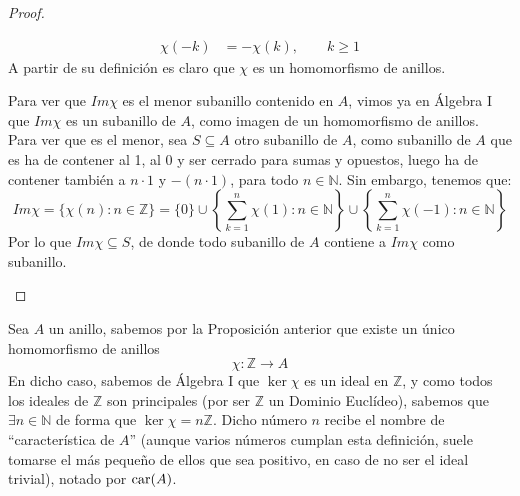 \begin{prop}
\begin{proof}
\begin{description}
\begin{align*}
                    \chi(-k) &= -\chi(k), \qquad k\geq 1
                \end{align*}
                A partir de su definición es claro que $\chi$ es un homomorfismo de anillos.
            \item [Minimalidad.] Para ver que $Im\chi$ es el menor subanillo contenido en $A$, vimos ya en Álgebra I que $Im\chi$ es un subanillo de $A$, como imagen de un homomorfismo de anillos. Para ver que es el menor, sea $S\subseteq A$ otro subanillo de $A$, como subanillo de $A$ que es ha de contener al 1, al 0 y ser cerrado para sumas y opuestos, luego ha de contener también a $n\cdot 1$ y $-(n\cdot 1)$, para todo $n\in \mathbb{N}$. Sin embargo, tenemos que:
                \begin{equation*}
                    Im\chi = \{\chi(n) : n\in \mathbb{Z}\} = \{0\}\cup \left\{\sum_{k=1}^{n}\chi(1) : n\in \mathbb{N}\right\} \cup \left\{\sum_{k=1}^{n}\chi(-1) : n\in \mathbb{N}\right\}
                \end{equation*}
                 Por lo que $Im\chi \subseteq S$, de donde todo subanillo de $A$ contiene a $Im \chi$ como subanillo.
        \end{description}
    \end{proof}
\end{prop}

\begin{definicion}
    Sea $A$ un anillo, sabemos por la Proposición anterior que existe un único homomorfismo de anillos 
    \begin{equation*}
        \chi:\mathbb{Z}\to A
    \end{equation*}
    En dicho caso, sabemos de Álgebra I que $\ker\chi$ es un ideal en $\mathbb{Z}$, y como todos los ideales de $\mathbb{Z}$ son principales (por ser $\mathbb{Z}$ un Dominio Euclídeo), sabemos que $\exists n\in \mathbb{N}$ de forma que $\ker\chi = n\mathbb{Z}$. Dicho número $n$ recibe el nombre de ``característica de $A$'' (aunque varios números cumplan esta definición, suele tomarse el más pequeño de ellos que sea positivo, en caso de no ser el ideal trivial), notado por $\operatorname{car}(A)$.
\end{definicion}

